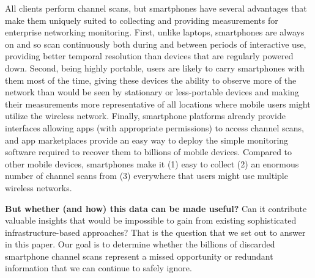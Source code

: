 All \wifi{} clients perform channel scans, but smartphones have several
advantages that make them uniquely suited to collecting and providing
measurements for enterprise networking monitoring. First, unlike laptops,
smartphones are always on and so scan continuously both during and between
periods of interactive use, providing better temporal resolution than devices
that are regularly powered down. Second, being highly portable, users are
likely to carry smartphones with them most of the time, giving these devices
the ability to observe more of the network than would be seen by stationary
or less-portable devices and making their measurements more representative of
all locations where mobile users might utilize the wireless network. Finally,
smartphone platforms already provide interfaces allowing apps (with
appropriate permissions) to access channel scans, and app marketplaces
provide an easy way to deploy the simple monitoring software required to
recover them to billions of mobile devices. Compared to other mobile devices,
smartphones make it (1) easy to collect (2) an enormous number of channel
scans from (3) everywhere that users might use multiple wireless networks.

\textbf{But whether (and how) this data can be made useful?} Can it contribute valuable
insights that would be impossible to gain from existing sophisticated
infrastructure-based approaches? That is the question that we set out to
answer in this paper. Our goal is to determine whether the billions of
discarded smartphone channel scans represent a missed opportunity or
redundant information that we can continue to safely ignore.


